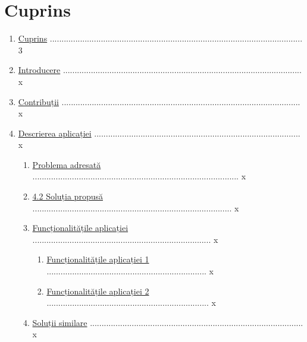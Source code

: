 \documentclass{article}
\begin{document}
\section{Cuprins}
\label{Cuprins}
\begin{enumerate}[itemsep=0.1ex,parsep=0.1ex,leftmargin=0cm]
    \item \hyperref[Cuprins]{Cuprins} ............................................................................................................. 3
    \item \hyperref[Introducere]{Introducere} ....................................................................................................... x
    \item \hyperref[Contribuții]{Contribuții} ....................................................................................................... x
    \item \hyperref[Descrierea aplicației]{Descrierea aplicației} ......................................................................................... x
    \begin{enumerate}[label*=\arabic*.,ref=\theenumi.\arabic*,itemsep=0.1ex,parsep=0.1ex,leftmargin=0.25cm]
        \item \hyperref[Problema adresată]{Problema adresată} ......................................................................................... x
        \item \hyperref[Soluția propusă]{4.2 Soluția propusă} ...................................................................................... x
        \item \hyperref[Funcționalitățile aplicației]{Funcționalitățile aplicației} ............................................................................. x
        \begin{enumerate}[label*=\arabic*.,ref=\theenumi.\theenumi.\arabic*,itemsep=0.1ex,parsep=0.1ex,leftmargin=0.3cm]
            \item \hyperref[Funcționalitățile aplicației 1]{Funcționalitățile aplicației 1} ..................................................................... x
            \item \hyperref[Funcționalitățile aplicației 2]{Funcționalitățile aplicației 2} ...................................................................... x
        \end{enumerate}
        \item \hyperref[Soluții similare]{Soluții similare} ............................................................................................ x

\end{enumerate}
\end{enumerate}
\end{document}
